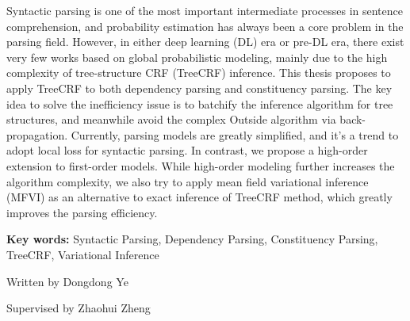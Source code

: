 
\begin{eabstract}
	Syntactic parsing is one of the most important intermediate processes in sentence comprehension,
	and probability estimation has always been a core problem in the parsing field.
	However, in either deep learning (DL) era or pre-DL era, there exist very few works based on global probabilistic modeling, mainly due to the high complexity of tree-structure CRF (TreeCRF) inference.
	This thesis proposes to apply TreeCRF to both dependency parsing and constituency parsing.
	The key idea to solve the inefficiency issue is to batchify the inference algorithm for tree structures, and meanwhile avoid the complex Outside algorithm via back-propagation.
	Currently, parsing models are greatly simplified, and it's a trend to adopt local loss for syntactic parsing.
	In contrast, we propose a high-order extension to first-order models.
	While high-order modeling further increases the algorithm complexity, we also try to apply mean field variational inference (MFVI) as an alternative to exact inference of TreeCRF method, which greatly improves the parsing efficiency.

	\vskip 21bp
	\noindent
	{\bf{} Key words: }
	Syntactic Parsing,
	Dependency Parsing,
	Constituency Parsing,
	TreeCRF,
	Variational Inference
\end{eabstract}

\begin{flushright}
	Written by Dongdong Ye
	
	Supervised by Zhaohui Zheng
\end{flushright}
